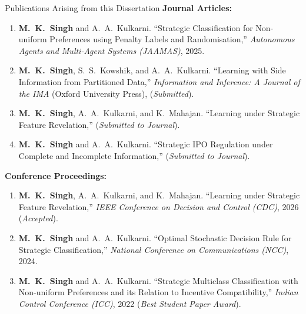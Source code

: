 \documentclass[aspectratio=169, 11pt, t, xcolor=table]{beamer}
\begin{document}
\begin{frame}{Publications Arising from this Dissertation}
\footnotesize
\textbf{Journal Articles:}
\begin{enumerate}
  \item \textbf{M.~K.~Singh} and A.~A.~Kulkarni. ``Strategic Classification for Non-uniform Preferences using Penalty Labels and Randomisation,'' \emph{Autonomous Agents and Multi-Agent Systems (JAAMAS)}, 2025.
  \item \textbf{M.~K.~Singh}, S.~S.~Kowshik, and A.~A.~Kulkarni. ``Learning with Side Information from Partitioned Data,'' \emph{Information and Inference: A Journal of the IMA} (Oxford University Press), (\emph{Submitted}).
  \item \textbf{M.~K.~Singh}, A.~A.~Kulkarni, and K.~Mahajan. ``Learning under Strategic Feature Revelation,'' (\emph{Submitted to Journal}).
  \item \textbf{M.~K.~Singh} and A.~A.~Kulkarni. ``Strategic IPO Regulation under Complete and Incomplete Information,'' (\emph{Submitted to Journal}).
\end{enumerate}

\par\vspace{0.2em}
\textbf{Conference Proceedings:}
\begin{enumerate}
  \item \textbf{M.~K.~Singh}, A.~A.~Kulkarni, and K.~Mahajan. ``Learning under Strategic Feature Revelation,'' \emph{IEEE Conference on Decision and Control (CDC)}, 2026 (\emph{Accepted}).
  \item \textbf{M.~K.~Singh} and A.~A.~Kulkarni. ``Optimal Stochastic Decision Rule for Strategic Classification,'' \emph{National Conference on Communications (NCC)}, 2024.
  \item \textbf{M.~K.~Singh} and A.~A.~Kulkarni. ``Strategic Multiclass Classification with Non-uniform Preferences and its Relation to Incentive Compatibility,'' \emph{Indian Control Conference (ICC)}, 2022 (\emph{Best Student Paper Award}).
\end{enumerate}
\end{frame}
\end{document}
